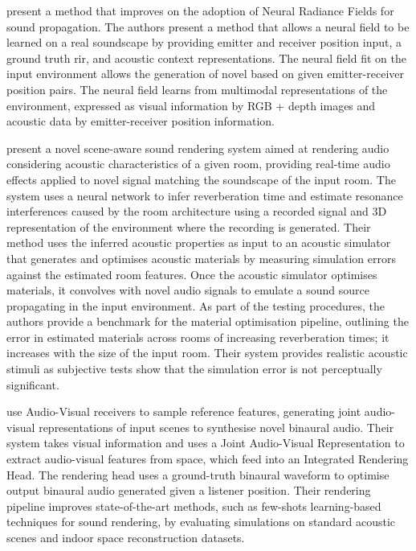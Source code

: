 \cite{liang2023neural} present a method that improves on the adoption of Neural Radiance Fields for sound propagation. The authors present a method that allows a neural field to be learned on a real soundscape by providing emitter and receiver position input, a ground truth \acrshort{rir}, and acoustic context representations. The neural field fit on the input environment allows the generation of novel  based on given emitter-receiver position pairs. The neural field learns from multimodal representations of the environment, expressed as visual information by RGB + depth images and acoustic data by emitter-receiver position information.\par

\cite{tang2020scene} present a novel scene-aware sound rendering system aimed at rendering audio considering acoustic characteristics of a given room, providing real-time audio effects applied to novel signal matching the soundscape of the input room. The system uses a neural network to infer reverberation time and estimate resonance interferences caused by the room architecture using a recorded signal and 3D representation of the environment where the recording is generated. Their method uses the inferred acoustic properties as input to an acoustic simulator that generates and optimises acoustic materials by measuring simulation errors against the estimated room features. Once the acoustic simulator optimises materials, it convolves  with novel audio signals to emulate a sound source propagating in the input environment. As part of the testing procedures, the authors provide a benchmark for the material optimisation pipeline, outlining the error in estimated materials across rooms of increasing reverberation times; it increases with the size of the input room. Their system provides realistic acoustic stimuli as subjective tests show that the simulation error is not perceptually significant.\par

\cite{chen2023everywhere} use Audio-Visual receivers to sample reference features, generating joint audio-visual representations of input scenes to synthesise novel binaural audio. Their system takes visual information and uses a Joint Audio-Visual Representation to extract audio-visual features from space, which feed into an Integrated Rendering Head. The rendering head uses a ground-truth binaural waveform to optimise output binaural audio generated given a listener position. Their rendering pipeline improves state-of-the-art methods, such as few-shots learning-based techniques for sound rendering, by evaluating simulations on standard acoustic scenes and indoor space reconstruction datasets.\par

